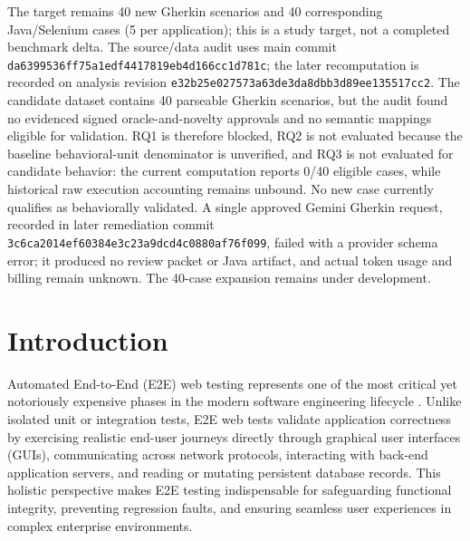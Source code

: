 \documentclass[pdflatex,sn-mathphys-num]{sn-jnl}
\begin{document}
{The target remains 40 new Gherkin scenarios and 40 corresponding Java/Selenium cases (5 per application); this is a study target, not a completed benchmark delta. The source/data audit uses main commit \texttt{da6399536ff75a1edf4417819eb4d166cc1d781c}; the later recomputation is recorded on analysis revision \texttt{e32b25e027573a63de3da8dbb3d89ee135517cc2}. The candidate dataset contains 40 parseable Gherkin scenarios, but the audit found no evidenced signed oracle-and-novelty approvals and no semantic mappings eligible for validation. RQ1 is therefore blocked, RQ2 is not evaluated because the baseline behavioral-unit denominator is unverified, and RQ3 is not evaluated for candidate behavior: the current computation reports 0/40 eligible cases, while historical raw execution accounting remains unbound. No new case currently qualifies as behaviorally validated. A single approved Gemini Gherkin request, recorded in later remediation commit \texttt{3c6ca2014ef60384e3c23a9dcd4c0880af76f099}, failed with a provider schema error; it produced no review packet or Java artifact, and actual token usage and billing remain unknown. The 40-case expansion remains under development.
}


\maketitle


\section{Introduction}\label{sec:intro}

Automated End-to-End (E2E) web testing represents one of the most critical yet notoriously expensive phases in the modern software engineering lifecycle \cite{leotta2016evaluating}. Unlike isolated unit or integration tests, E2E web tests validate application correctness by exercising realistic end-user journeys directly through graphical user interfaces (GUIs), communicating across network protocols, interacting with back-end application servers, and reading or mutating persistent database records. This holistic perspective makes E2E testing indispensable for safeguarding functional integrity, preventing regression faults, and ensuring seamless user experiences in complex enterprise environments.
\end{document}
